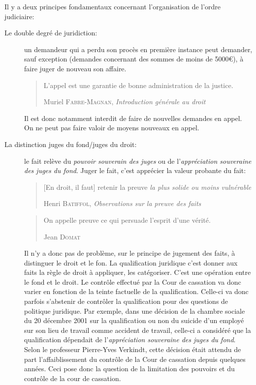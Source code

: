 \documentclass[math]{cours}
\begin{document}
Il y a deux principes fondamentaux concernant l'organisation de l'ordre judiciaire:
\begin{description}
	\item[Le double degré de juridiction:]
	      un demandeur qui a perdu son procès en première instance peut demander, sauf exception (demandes concernant des sommes de moins de 5000€),
	      à faire juger de nouveau son affaire.
	      \begin{quote}
		      L'appel est une garantie de bonne administration de la justice.
		      \begin{flushright}
			      Muriel \textsc{Fabre-Magnan}, \textit{Introduction générale au droit}
		      \end{flushright}
	      \end{quote}
	      Il est donc notamment interdit de faire de nouvelles demandes en appel.
	      On ne peut pas faire valoir de moyens nouveaux en appel.
	\item[La distinction juges du fond/juges du droit:]
	      le fait relève du \emph{pouvoir souverain des juges} ou de l'\emph{appréciation souveraine des juges du fond}.
	      Juger le fait, c'est apprécier la valeur probante du fait:
	      \begin{quote}
		      [En droit, il faut] retenir la preuve \emph{la plus solide ou moins vulnérable}
		      \begin{flushright}
			      Henri \textsc{Batiffol}, \textit{Observations sur la preuve des faits}
		      \end{flushright}

	      \end{quote}
	      \begin{quote}
		      On appelle preuve ce qui persuade l'esprit d'une vérité.
		      \begin{flushright}
			      Jean \textsc{Domat}
		      \end{flushright}

	      \end{quote}
	      Il n'y a donc pas de problème, sur le principe de jugement des faits, à distinguer le droit et le fon.
	      La qualification juridique c'est donner aux faits la règle de droit à appliquer, les catégoriser.
	      C'est une opération entre le fond et le droit.
	      Le contrôle effectué par la Cour de cassation va donc varier en fonction de la teinte factuelle de la qualification.
	      Celle-ci va donc parfois s'abstenir de contrôler la qualification pour des questions de politique juridique.
	      Par exemple, dans une décision de la chambre sociale du 20 décembre 2001 sur la qualification ou non du suicide d'un employé sur son lieu de travail comme accident de travail,
	      celle-ci a considéré que la qualification dépendait de l'\emph{appréciation souveraine des juges du fond}.
	      Selon le professeur Pierre-Yves Verkindt, cette décision était attendu de part l'affaiblissement du contrôle de la Cour de cassation depuis quelques années.
	      Ceci pose donc la question de la limitation des pouvoirs et du contrôle de la cour de cassation.
\end{description}
\end{document}
